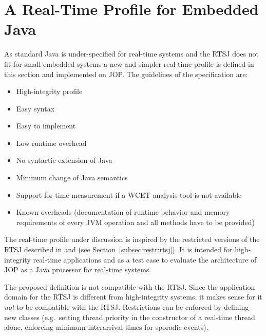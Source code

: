 
\section{A Real-Time Profile for Embedded Java}
\label{sec:rtprof}

As standard Java is under-specified for real-time systems and the
RTSJ does not fit for small embedded systems a new and simpler
real-time profile is defined in this section and implemented on JOP.
The guidelines of the specification are:

\begin{itemize}
\item High-integrity profile
\item Easy syntax
\item Easy to implement
\item Low runtime overhead
\item No syntactic extension of Java
\item Minimum change of Java semantics
\item Support for time measurement if a WCET analysis tool is not available
\item Known overheads (documentation of runtime behavior and memory
requirements of every JVM operation and all methods have to be
provided)
\end{itemize}

The real-time profile under discussion is inspired by the restricted
versions of the RTSJ described in \cite{Pusch01} and
\cite{ravenscar:java} (see Section~\ref{subsec:restr:rtsj}). It is
intended for high-integrity real-time applications and as a test case
to evaluate the architecture of JOP as a Java processor for real-time
systems.

The proposed definition is not compatible with the RTSJ. Since the
application domain for the RTSJ is different from high-integrity
systems, it makes sense for it \emph{not} to be compatible with the
RTSJ. Restrictions can be enforced by defining new classes (e.g.\
setting thread priority in the constructor of a real-time thread
alone, enforcing minimum interarrival times for sporadic events).


